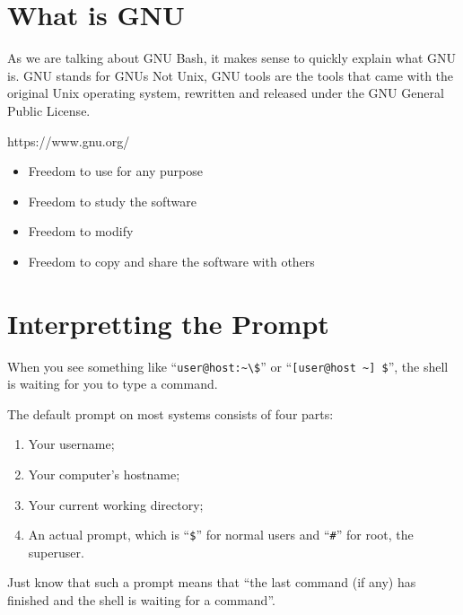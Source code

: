 \documentclass{extbook}
\begin{document}
\section{What is GNU}

As we are talking about GNU Bash, it makes sense to quickly explain what GNU is.   GNU stands for GNUs Not Unix,  GNU tools are the tools that came with the original Unix operating system, rewritten and released under the GNU General Public License. 

https://www.gnu.org/

\begin{itemize}
\item Freedom to use for any purpose
\item Freedom to study the software
\item Freedom to modify
\item Freedom to copy and share the software with others
\end{itemize}

\section{Interpretting the Prompt}

When you see something like ``\verb|user@host:~\$|'' or ``\verb|[user@host ~] $|'', the shell is waiting for you to type a command.

The default prompt on most systems consists of four parts:
\begin{enumerate}
	\item Your username;
	\item Your computer's hostname;
	\item Your current working directory;
	\item An actual prompt, which is ``\verb|$|'' for normal users and ``\verb|#|'' for root, the superuser.
\end{enumerate}


Just know that such a prompt means that ``the last command (if any) has finished and the shell is waiting for a command''.
\end{document}
